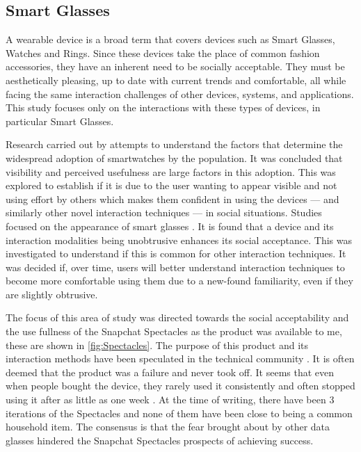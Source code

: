 \documentclass{l4proj}
\begin{document}
\subsection{Smart Glasses}

A wearable device is a broad term that covers devices such as Smart Glasses, Watches and Rings. Since these devices take the place of common fashion accessories, they have an inherent need to be socially acceptable. They must be aesthetically pleasing, up to date with current trends and comfortable, all while facing the same interaction challenges of other devices, systems, and applications. This study focuses only on the interactions with these types of devices, in particular Smart Glasses.

Research carried out by \citet{chuah_wearable_2016} attempts to understand the factors that determine the widespread adoption of smartwatches by the population. It was concluded that visibility and perceived usefulness are large factors in this adoption. This was explored to establish if it is due to the user wanting to appear visible and not using effort by others which makes them confident in using the devices --- and similarly other novel interaction techniques --- in social situations. Studies focused on the appearance of smart glasses \citep{chuah_wearable_2016}. It is found that a device and its interaction modalities being unobtrusive enhances its social acceptance. This was investigated to understand if this is common for other interaction techniques. It was decided if, over time, users will better understand interaction techniques to become more comfortable using them due to a new-found familiarity, even if they are slightly obtrusive.

The focus of this area of study was directed towards the social acceptability and the use fullness of the Snapchat Spectacles as the product was available to me, these are shown in \autoref{fig:Spectacles}. The purpose of this product and its interaction methods have been speculated in the technical community \citep{constine_why_2017}. It is often deemed that the product was a failure and never took off. It seems that even when people bought the device, they rarely used it consistently and often stopped using it after as little as one week \citep{constine_why_2017}. At the time of writing, there have been 3 iterations of the Spectacles and none of them have been close to being a common household item. The consensus is that the fear brought about by other data glasses \citep{koelle_dont_2015} hindered the Snapchat Spectacles prospects of achieving success.
\end{document}
